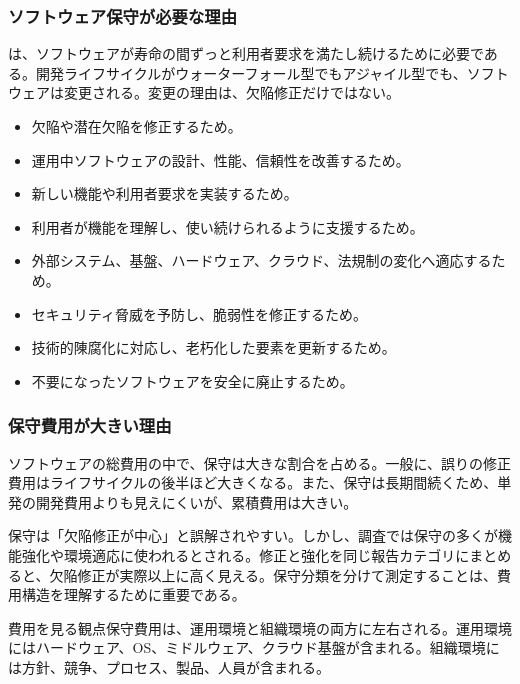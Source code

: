 \subsubsection{ソフトウェア保守が必要な理由}
は、ソフトウェアが寿命の間ずっと利用者要求を満たし続けるために必要である。開発ライフサイクルがウォーターフォール型でもアジャイル型でも、ソフトウェアは変更される。変更の理由は、欠陥修正だけではない。\par
\begin{itemize}
\item 欠陥や潜在欠陥を修正するため。
\item 運用中ソフトウェアの設計、性能、信頼性を改善するため。
\item 新しい機能や利用者要求を実装するため。
\item 利用者が機能を理解し、使い続けられるように支援するため。
\item 外部システム、基盤、ハードウェア、クラウド、法規制の変化へ適応するため。
\item セキュリティ脅威を予防し、脆弱性を修正するため。
\item 技術的陳腐化に対応し、老朽化した要素を更新するため。
\item 不要になったソフトウェアを安全に廃止するため。
\end{itemize}
\subsubsection{保守費用が大きい理由}
ソフトウェアの総費用の中で、保守は大きな割合を占める。一般に、誤りの修正費用はライフサイクルの後半ほど大きくなる。また、保守は長期間続くため、単発の開発費用よりも見えにくいが、累積費用は大きい。\par
保守は「欠陥修正が中心」と誤解されやすい。しかし、調査では保守の多くが機能強化や環境適応に使われるとされる。修正と強化を同じ報告カテゴリにまとめると、欠陥修正が実際以上に高く見える。保守分類を分けて測定することは、費用構造を理解するために重要である。\par
\begin{pointbox}{費用を見る観点}保守費用は、運用環境と組織環境の両方に左右される。運用環境にはハードウェア、OS、ミドルウェア、クラウド基盤が含まれる。組織環境には方針、競争、プロセス、製品、人員が含まれる。\end{pointbox}
